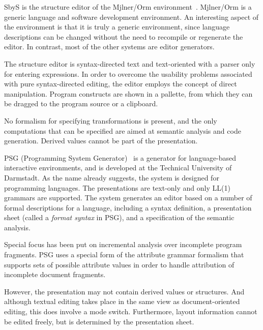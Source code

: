 
SbyS is the structure editor of the Mj\slasho lner/Orm environment~\cite{magnusson90orm}. Mj\slasho lner/Orm is a generic language and software development environment. An interesting aspect of the environment is that it is truly a generic environment, since language descriptions can be changed without the need to recompile or regenerate the editor. In contrast, most of the other systems are editor generators.

The structure editor is syntax-directed text and text-oriented with a parser only for entering expressions. In order to overcome the usability problems associated with pure syntax-directed editing, the editor employs the concept of direct manipulation. Program constructs are shown in a pallette, from which they can be dragged to the program source or a clipboard.

No formalism for specifying transformations is present, and the only computations that can be specified are aimed at semantic analysis and code generation. Derived values cannot be part of the presentation.



PSG (Programming System Generator)~\cite{Bahlke86PSG} is a generator for language-based interactive environments, and is developed at the Technical University of Darmstadt. As the name already suggests, the system is designed for programming languages. The presentations are text-only and only LL(1) grammars are supported. The system generates an editor based on a number of formal descriptions for a language, including a syntax definition, a presentation sheet (called a {\em format syntax} in PSG), and a specification of the semantic analysis.

Special focus has been put on incremental analysis over incomplete program fragments. PSG uses a special form of the attribute grammar formalism that supports sets of possible attribute values in order to handle attribution of incomplete document fragments.

However, the presentation may not contain derived values or structures. And although textual editing takes place in the same view as document-oriented editing, this does involve a mode switch. Furthermore, layout information cannot be edited freely, but is determined by the presentation sheet.


